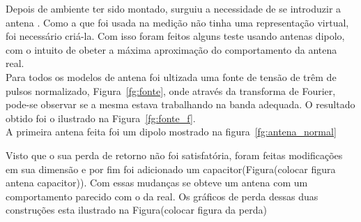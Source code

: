 Depois de ambiente ter sido montado, surguiu a necessidade de se introduzir a antena . Como a que foi usada na medição não tinha uma representação virtual, foi necessário criá-la. Com isso foram feitos alguns teste usando antenas dipolo, com o intuito de obeter a máxima aproximação do comportamento da antena real. \\

Para todos os modelos de antena foi ultizada uma fonte de tensão de trêm de pulsos normalizado, Figura~\ref{fg:fonte}, onde através da transforma de Fourier, pode-se observar se a mesma estava trabalhando na banda adequada. O resultado obtido foi o ilustrado na Figura~\ref{fg:fonte_f}.\\

A primeira antena feita foi um dipolo mostrado na figura~\ref{fg:antena_normal}







 Visto que o sua perda de retorno não foi satisfatória, foram feitas modificações em sua dimensão e por fim foi adicionado um  capacitor(Figura(colocar figura antena capacitor)). Com essas mudanças se obteve um antena com um comportamento parecido com o da real. Os gráficos de perda dessas duas construções esta ilustrado na Figura(colocar figura da perda)
